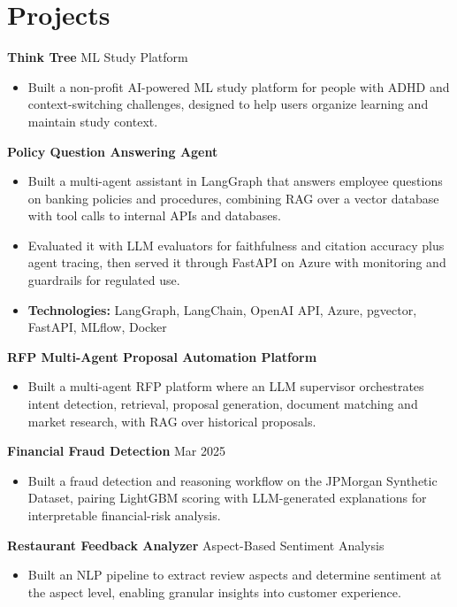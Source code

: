 \documentclass[10pt,a4paper]{article}
\begin{document}
\section{Projects}
\textbf{Think Tree} \textbar{} ML Study Platform\par
\begin{itemize}
  \item Built a non-profit AI-powered ML study platform for people with ADHD and context-switching challenges, designed to help users organize learning and maintain study context.
\end{itemize}
\textbf{Policy Question Answering Agent}\par
\begin{itemize}
  \item Built a multi-agent assistant in LangGraph that answers employee questions on banking policies and procedures, combining RAG over a vector database with tool calls to internal APIs and databases.
  \item Evaluated it with LLM evaluators for faithfulness and citation accuracy plus agent tracing, then served it through FastAPI on Azure with monitoring and guardrails for regulated use.
  \item \textbf{Technologies:} LangGraph, LangChain, OpenAI API, Azure, pgvector, FastAPI, MLflow, Docker
\end{itemize}
\textbf{RFP Multi-Agent Proposal Automation Platform}\par
\begin{itemize}
  \item Built a multi-agent RFP platform where an LLM supervisor orchestrates intent detection, retrieval, proposal generation, document matching and market research, with RAG over historical proposals.
\end{itemize}
\textbf{Financial Fraud Detection} \textbar{} Mar 2025\par
\begin{itemize}
  \item Built a fraud detection and reasoning workflow on the JPMorgan Synthetic Dataset, pairing LightGBM scoring with LLM-generated explanations for interpretable financial-risk analysis.
\end{itemize}
\textbf{Restaurant Feedback Analyzer} \textbar{} Aspect-Based Sentiment Analysis\par
\begin{itemize}
  \item Built an NLP pipeline to extract review aspects and determine sentiment at the aspect level, enabling granular insights into customer experience.
\end{itemize}
\end{document}

